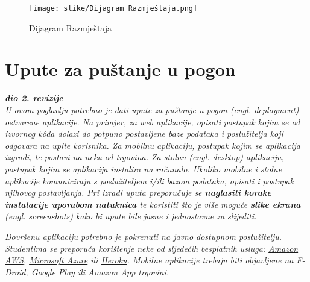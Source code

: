 		\begin{figure}[H]
			\texttt{[image: slike/Dijagram Razmještaja.png]} %
			\centering
			\caption { Dijagram Razmještaja}
			\label{fig:5.1}
			\end{figure}


\begin{comment}	
	\textit{Potrebno je umetnuti \textbf{specifikacijski} dijagram razmještaja i opisati ga. Moguće je umjesto specifikacijskog dijagrama razmještaja umetnuti dijagram razmještaja instanci, pod uvjetom da taj dijagram bolje opisuje neki važniji dio sustava.}
	
	\eject 
\end{comment}

\newpage


\section{Upute za puštanje u pogon}

	\textbf{\textit{dio 2. revizije}}\\

	\textit{U ovom poglavlju potrebno je dati upute za puštanje u pogon (engl. deployment) ostvarene aplikacije. Na primjer, za web aplikacije, opisati postupak kojim se od izvornog kôda dolazi do potpuno postavljene baze podataka i poslužitelja koji odgovara na upite korisnika. Za mobilnu aplikaciju, postupak kojim se aplikacija izgradi, te postavi na neku od trgovina. Za stolnu (engl. desktop) aplikaciju, postupak kojim se aplikacija instalira na računalo. Ukoliko mobilne i stolne aplikacije komuniciraju s poslužiteljem i/ili bazom podataka, opisati i postupak njihovog postavljanja. Pri izradi uputa preporučuje se \textbf{naglasiti korake instalacije uporabom natuknica} te koristiti što je više moguće \textbf{slike ekrana} (engl. screenshots) kako bi upute bile jasne i jednostavne za slijediti.}
		
		
	\textit{Dovršenu aplikaciju potrebno je pokrenuti na javno dostupnom poslužitelju. Studentima se preporuča korištenje neke od sljedećih besplatnih usluga: \href{https://aws.amazon.com/}{Amazon AWS}, \href{https://azure.microsoft.com/en-us/}{Microsoft Azure} ili \href{https://www.heroku.com/}{Heroku}. Mobilne aplikacije trebaju biti objavljene na F-Droid, Google Play ili Amazon App trgovini.}
	
	
	\eject 

